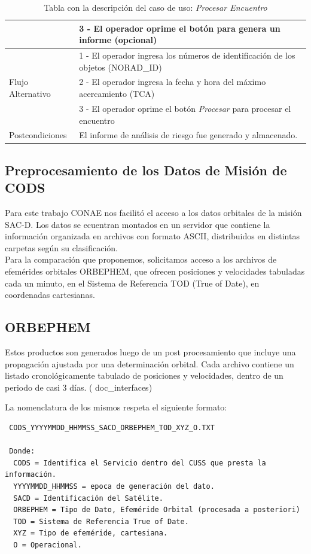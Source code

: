 \begin{table}[h]
{\begin{tabular}[c]{|l|l|}
& 3 - El operador oprime el bot\'on para genera un informe (opcional)\\
\hline
\multirow{ 3}{*}{Flujo Alternativo} & 1 - El operador ingresa los n\'umeros de identificaci\'on de los objetos (NORAD\_ID) \\
& 2 - El operador ingresa la fecha y hora del m\'aximo acercamiento (TCA)\\
& 3 - El operador oprime el bot\'on {\it{Procesar}} para procesar el encuentro\\
\hline
Postcondiciones & El informe de an\'alisis de riesgo fue generado y almacenado.\\
\hline
\end{tabular}}
\caption[Caso de Uso: Procesar Encuentro]{Tabla con la descripci\'on del caso de uso: \it{Procesar Encuentro}}
\label{tab:usoproceso}
\end{table}

\subsection*{Preprocesamiento de los Datos de Misi\'on de CODS}
Para este trabajo CONAE nos facilit\'o el acceso a los datos orbitales de la misi\'on SAC-D.
Los datos se ecuentran montados en un servidor que contiene la informaci\'on organizada en archivos con formato ASCII, distribuidos en distintas carpetas seg\'un su clasificaci\'on.\\
Para la comparaci\'on que proponemos, solicitamos acceso a los archivos de efem\'erides orbitales ORBEPHEM, que ofrecen posiciones y velocidades tabuladas cada un minuto, en el Sistema de Referencia TOD (True of Date), en coordenadas cartesianas.

\subsection*{ORBEPHEM}
Estos productos son generados luego de un post procesamiento que incluye una propagaci\'on ajustada por una determinaci\'on orbital. 
Cada archivo contiene un listado cronol\'ogicamente tabulado de posiciones y velocidades, dentro de un periodo de casi 3 d\'ias. ( doc\_interfaces)

La nomenclatura de los mismos respeta el siguiente formato:\\
\begin{verbatim}
 CODS_YYYYMMDD_HHMMSS_SACD_ORBEPHEM_TOD_XYZ_O.TXT
 
 Donde:
  CODS = Identifica el Servicio dentro del CUSS que presta la información.
  YYYYMMDD_HHMMSS = epoca de generación del dato.
  SACD = Identificación del Satélite.
  ORBEPHEM = Tipo de Dato, Efeméride Orbital (procesada a posteriori)
  TOD = Sistema de Referencia True of Date.
  XYZ = Tipo de efeméride, cartesiana.
  O = Operacional. 
\end{verbatim}


